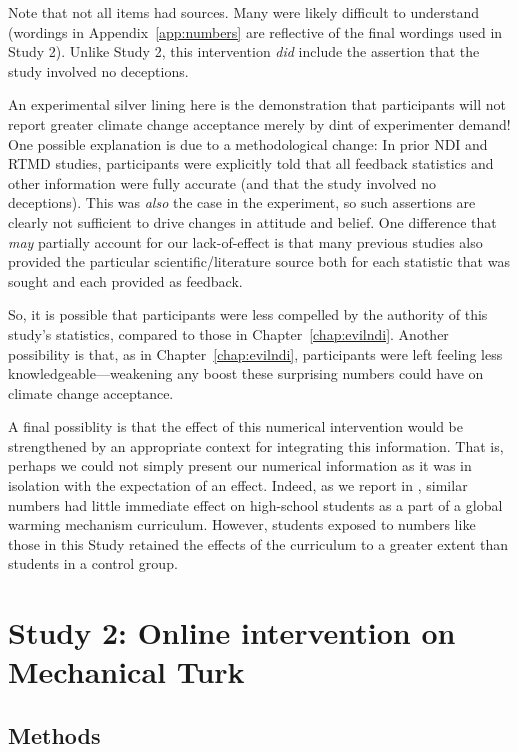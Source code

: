 Note that not all items had sources. Many were likely difficult to understand
(wordings in Appendix~\ref{app:numbers} are reflective of the final wordings
used in Study 2). Unlike Study 2, this intervention \emph{did} include the
assertion that the study involved no deceptions.

An experimental silver lining here is the demonstration that
participants will not report greater climate change acceptance merely by dint of
experimenter demand! One possible explanation is due to a methodological change:
In prior NDI and RTMD studies, participants were explicitly told that all
feedback statistics and other information were fully accurate (and that the
study involved no deceptions). This was \emph{also} the case in the experiment,
so such assertions are clearly not sufficient to drive changes in attitude and
belief.  One difference that \emph{may} partially account for our lack-of-effect
is that many previous studies also provided the particular scientific/literature
source both for each statistic that was sought and each provided as feedback.

So, it is possible that participants were less compelled by the authority of
this study’s statistics, compared to those in Chapter~\ref{chap:evilndi}.
Another possibility is that, as in Chapter~\ref{chap:evilndi}, participants were
left feeling less knowledgeable—weakening any boost these surprising numbers
could have on climate change acceptance.  

A final possiblity is that the effect of this numerical intervention would be
strengthened by an appropriate context for integrating this information. That
is, perhaps we could not simply present our numerical information as it was in
isolation with the expectation of an effect. Indeed, as we report in
\cite{clark_knowledge_inpress}, similar numbers had little immediate effect on
high-school students as a part of a global warming mechanism curriculum.
However, students exposed to numbers like those in this Study retained the
effects of the curriculum to a greater extent than students in a control group.

\section{Study 2: Online intervention on Mechanical Turk}

\subsection{Methods}


